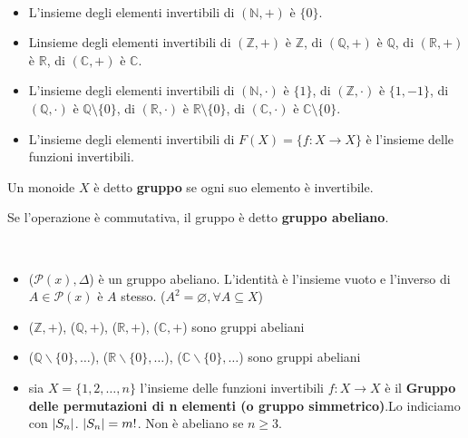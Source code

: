 \documentclass[../main.tex]{subfiles}
\begin{document}
\begin{example}
    \
    \begin{itemize}
        \item L'insieme degli elementi invertibili di $(\mathbb{N},+)$ è $\{0\}$.
        \item Linsieme degli elementi invertibili di $(\mathbb{Z},+)$ è $\mathbb{Z}$, di $(\mathbb{Q},+)$
              è $\mathbb{Q}$, di $(\mathbb{R},+)$ è $\mathbb{R}$, di $(\mathbb{C},+)$ è $\mathbb{C}$.
        \item L'insieme degli elementi invertibili di $(\mathbb{N},\cdot)$ è $\{1\}$, di $(\mathbb{Z},\cdot)$
              è $\{1,-1\}$, di $(\mathbb{Q},\cdot)$ è $\mathbb{Q} \setminus \{0\}$, di $(\mathbb{R},\cdot)$ è
              $\mathbb{R} \setminus \{0\}$, di $(\mathbb{C},\cdot)$ è $\mathbb{C} \setminus \{0\}$.
        \item L'insieme degli elementi invertibili di $F(X) = \{f: X \rightarrow X\}$ è l'insieme delle funzioni
              invertibili.
    \end{itemize}
\end{example}

\begin{definition}[Gruppo]
    Un monoide $X$ è detto \textbf{gruppo} se ogni suo elemento è invertibile.
\end{definition}
\begin{definition}
    Se l'operazione è commutativa, il gruppo è detto \textbf{gruppo abeliano}.
\end{definition}

\begin{example}
    \
    \begin{itemize}
        \item ($\mathcal{P}(x) ,\Delta $) è un gruppo abeliano. L'identità è l'insieme vuoto e l'inverso
              di $A \in \mathcal{P}(x)$ è $A$ stesso. ($A^2 = \varnothing,  \forall A \subseteq X $)
        \item ($\mathbb{Z},+$), ($\mathbb{Q},+$), ($\mathbb{R},+$), ($\mathbb{C},+$) sono gruppi abeliani
        \item ($\mathbb{Q}\backslash \{0\}, \ldots$), ($\mathbb{R}\backslash \{0\}, \ldots$),
              ($\mathbb{C}\backslash \{0\}, \ldots$) sono gruppi abeliani
        \item sia $X= \{1,2,\ldots,n\}$ l'insieme delle funzioni invertibili $f:X \rightarrow X$ è il
              \textbf{Gruppo delle permutazioni di n elementi (o gruppo simmetrico)}.Lo indiciamo con $\lvert S_n\rvert$.
              $\lvert S_n\rvert = m!$. Non è abeliano se $n \geq 3$.
    \end{itemize}
\end{example}
\end{document}
